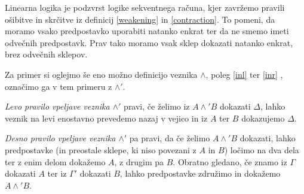 Linearna logika je podzvrst logike sekventnega računa, kjer zavržemo pravili ošibitve in skrčitve iz definicij \ref{weakening} in \ref{contraction}. To pomeni, da moramo vsako predpostavko uporabiti natanko enkrat ter da ne smemo imeti odvečnih predpostavk. Prav tako moramo vsak sklep dokazati natanko enkrat, brez odvečnih sklepov.

Za primer si oglejmo še eno možno definicijo veznika $\land$, poleg \ref{inl} ter \ref{inr} , označimo ga v tem primeru z $\land'$.
\begin{definicija} \label{in'l}
    \emph{Levo pravilo vpeljave veznika $\land'$} pravi, če želimo iz $A \land' B$ dokazati $\Delta$, lahko veznik na levi enostavno prevedemo nazaj v vejico in iz $A$ ter $B$ dokazujemo $\Delta$.
    \begin{prooftree}
    \end{prooftree}
\end{definicija}

\begin{definicija} \label{in'r}
	\emph{Desno pravilo vpeljave veznika $\land'$} pa pravi, da če želimo $A \land' B$ dokazati, lahko predpostavke (in preostale sklepe, ki niso povezani z $A$ in $B$) ločimo na dva dela ter z enim delom dokažemo $A$, z drugim pa $B$. Obratno gledano, če znamo iz $\Gamma$ dokazati $A$ ter iz $\Gamma'$ dokazati $B$, lahko predpostavke združimo in dokažemo $A \land' B$.
    \begin{prooftree}
    \end{prooftree}
\end{definicija}


